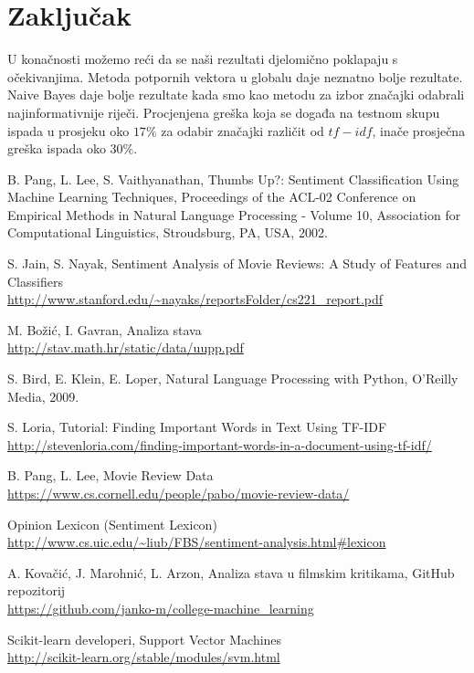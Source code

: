 \documentclass[conference]{IEEEtran}
\begin{document}
\section{Zaključak}

U konačnosti možemo reći da se naši rezultati djelomično poklapaju s
očekivanjima. Metoda potpornih vektora u globalu daje neznatno bolje rezultate.
Naive Bayes daje bolje rezultate kada smo kao metodu za izbor značajki odabrali
najinformativnije riječi. Procjenjena greška koja se događa na testnom skupu
ispada u prosjeku oko $17\%$ za odabir značajki različit od $tf-idf$, inače
prosječna greška ispada oko $30\%$.

\begin{thebibliography}{1}

	B. Pang, L. Lee, S. Vaithyanathan,
 	Thumbs Up?: Sentiment Classification Using Machine Learning Techniques,
 	Proceedings of the ACL-02 Conference on Empirical Methods in Natural Language Processing - Volume 10,
 	Association for Computational Linguistics,
	Stroudsburg, PA, USA,
	2002.
	
	S. Jain, S. Nayak,
	Sentiment Analysis of Movie Reviews: A Study of Features and Classifiers\\
	\url{http://www.stanford.edu/~nayaks/reportsFolder/cs221_report.pdf}
	
	M. Božić, I. Gavran,
	Analiza stava\\
	\url{http://stav.math.hr/static/data/uupp.pdf}
	
	S. Bird, E. Klein, E. Loper,
	Natural Language Processing with Python,
	O'Reilly Media,
	2009.
	
	S. Loria,
	Tutorial: Finding Important Words in Text Using TF-IDF\\
	\url{http://stevenloria.com/finding-important-words-in-a-document-using-tf-idf/}

	B. Pang, L. Lee,
	Movie Review Data\\
	\url{https://www.cs.cornell.edu/people/pabo/movie-review-data/}
	
	Opinion Lexicon (Sentiment Lexicon)\\
	\url{http://www.cs.uic.edu/~liub/FBS/sentiment-analysis.html#lexicon}
	
	A. Kovačić, J. Marohnić, L. Arzon,
	Analiza stava u filmskim kritikama,
	GitHub repozitorij\\
	\url{https://github.com/janko-m/college-machine_learning}

    Scikit-learn developeri,
    Support Vector Machines\\
    \url{http://scikit-learn.org/stable/modules/svm.html}

\end{thebibliography}
\end{document}
